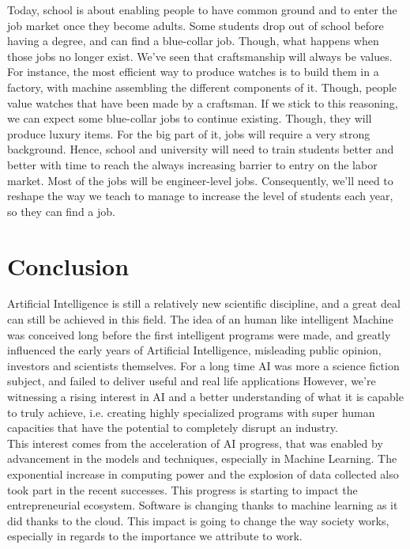 \documentclass[12pt]{article}
\begin{document}
Today, school is about enabling people to have common ground and to enter the
job market once they become adults. Some students drop out of school before
having a degree, and can find a blue-collar job. Though, what happens when those
jobs no longer exist.
We've seen that craftsmanship will always be values. For instance, the most
efficient way to produce watches is to build them in a factory, with machine
assembling the different components of it. Though, people value watches that have
been made by a craftsman. If we stick to this reasoning, we can expect some
blue-collar jobs to continue existing. Though, they will produce luxury items.
For the big part of it, jobs will require a very strong background. Hence,
school and university will need to train students better and better with time to
reach the always increasing barrier to entry on the labor market. Most of the
jobs will be engineer-level jobs.
Consequently, we'll need to reshape the way we teach to manage to increase the
level of students each year, so they can find a job.

\pagebreak


\section*{Conclusion}\label{conclusion}

\bigskip

Artificial Intelligence is still a relatively new scientific discipline, and a
great deal can still be achieved in this field. The idea of an human like
intelligent Machine was conceived long before the first intelligent programs
were made, and greatly influenced the early years of Artificial Intelligence,
misleading public opinion, investors and scientists themselves. For a long time
AI was more a science fiction subject, and failed to deliver useful and real
life applications However, we're witnessing a rising interest in AI and a better
understanding of what it  is capable to truly achieve, i.e. creating highly
specialized programs with super  human capacities that have the potential to
completely disrupt an industry.\\

This interest comes from the acceleration of AI progress, that was enabled by
advancement in the models and techniques, especially in Machine Learning. The
exponential increase in computing power and the explosion of data collected also
took part in the recent successes. This progress is starting to impact the
entrepreneurial ecosystem. Software is changing thanks to machine learning as
it did thanks to the cloud. This impact is going to change the way society
works, especially in regards to the  importance we attribute to work.\\
\end{document}
